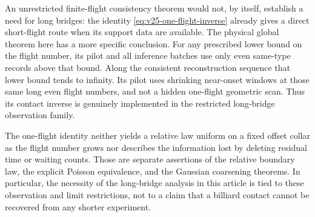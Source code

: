 An unrestricted finite-flight consistency theorem would not, by itself,
establish a need for long bridges: the identity
\eqref{eq:v25-one-flight-inverse} already gives a direct short-flight route
when its support data are available.  The physical global theorem here has
a more specific conclusion.  For any prescribed lower bound on the flight
number, its pilot and all inference batches use only even same-type records
above that bound.  Along the consistent reconstruction sequence that lower
bound tends to infinity.  Its pilot uses shrinking near-onset windows at
those same long even flight numbers, and not a hidden one-flight geometric
scan.  Thus its contact inverse is genuinely implemented in the restricted
long-bridge observation family.

The one-flight identity neither yields a relative law uniform on a fixed
offset collar as the flight number grows nor describes the information lost
by deleting residual time or waiting counts.  Those are separate assertions
of the relative boundary law, the explicit Poisson equivalence, and the
Gaussian coarsening theorems.  In particular, the necessity of the
long-bridge analysis in this article is tied to these observation and limit
restrictions, not to a claim that a billiard contact cannot be recovered from
any shorter experiment.
